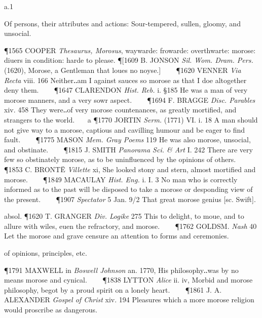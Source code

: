 \begin{description}[wide, labelwidth=!, labelindent=0pt]
\begin{myenumerate}
\end{myenumerate}


 a.1

\noindent {}

\vspace{-0.3cm}

\begin{myenumerate}

 Of persons, their attributes and actions: Sour-tempered, sullen, gloomy, and unsocial.

\P 1565 COOPER  \textit{Thesaurus, Morosus}, waywarde: frowarde: overthwarte: morose: diuers in condition: harde to please.
\P [1609 B. JONSON  \textit{Sil. Wom. Dram. Pers.} (1620), Morose, a Gentleman that loues no noyse.]    
\P 1620 VENNER  \textit{Via Recta} viii. 166 Neither‥am I against sauces so morose as that I doe altogether deny them.    
\P 1647 CLARENDON  \textit{Hist. Reb.} i. §185 He was a man of very morose manners, and a very sowr aspect.    
\P 1694 F. BRAGGE  \textit{Disc. Parables} xiv. 458 They were‥of very morose countenances, as greatly mortified, and strangers to the world.    a 
\P 1770 JORTIN  \textit{Serm.} (1771) VI. i. 18 A man should not give way to a morose, captious and cavilling humour and be eager to find fault.    
\P 1775 MASON  \textit{Mem. Gray Poems} 119 He was also morose, unsocial, and obstinate.    
\P 1815 J. SMITH  \textit{Panorama Sci. \& Art} I. 242 There are very few so obstinately morose, as to be uninfluenced by the opinions of others.    
\P 1853 C. BRONTË  \textit{Villette} xi, She looked stony and stern, almost mortified and morose.    
\P 1849 MACAULAY  \textit{Hist. Eng.} i. I. 3 No man who is correctly informed as to the past will be disposed to take a morose or desponding view of the present.    
\P 1907  \textit{Spectator} 5 Jan. 9/2 That great morose genius [sc. Swift].

absol. \P 1620 T. GRANGER  \textit{Div. Logike} 275 This to delight, to moue, and to allure with wiles, euen the refractory, and morose.    
\P 1762 GOLDSM.  \textit{Nash} 40 Let the morose and grave censure an attention to forms and ceremonies.

 of opinions, principles, etc.

\P 1791 MAXWELL in  \textit{Boswell Johnson} an. 1770, His philosophy‥was by no means morose and cynical.    
\P 1838 LYTTON  \textit{Alice} ii. iv, Morbid and morose philosophy, begot by a proud spirit on a lonely heart.    
\P 1861 J. A. ALEXANDER  \textit{Gospel of Christ} xiv. 194 Pleasures which a more morose religion would proscribe as dangerous.


\end{myenumerate}
\end{description}
